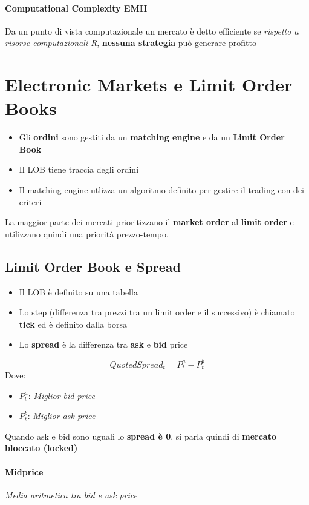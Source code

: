 \documentclass[12pt]{article}
\begin{document}
\paragraph{Computational Complexity EMH}
Da un punto di vista computazionale un mercato è detto efficiente se \textit{rispetto a risorse computazionali R}, \textbf{nessuna strategia} può generare profitto
\newpage
\section{Electronic Markets e Limit Order Books}
\begin{itemize}
    \item Gli \textbf{ordini} sono gestiti da un \textbf{matching engine} e da un \textbf{Limit Order Book}
    \item Il LOB tiene traccia degli ordini
    \item Il matching engine utlizza un algoritmo definito per gestire il trading con dei criteri
\end{itemize}
La maggior parte dei mercati prioritizzano il \textbf{market order} al \textbf{limit order} e utilizzano quindi una priorità prezzo-tempo.
\subsection{Limit Order Book e Spread}
\begin{itemize}
    \item Il LOB è definito su una tabella
    \item Lo step (differenza tra prezzi tra un limit order e il successivo) è chiamato \textbf{tick} ed è definito dalla borsa
    \item Lo \textbf{spread} è la differenza tra \textbf{ask} e \textbf{bid} price
\end{itemize}
$$QuotedSpread_t = P_t^a-P_t^b$$
Dove:
\begin{itemize}[label=]
    \item $P_t^a$: \textit{Miglior bid price}
    \item $P_t^b$: \textit{Miglior ask price}
\end{itemize}
Quando ask e bid sono uguali lo \textbf{spread è 0}, si parla quindi di \textbf{mercato bloccato (locked)}
\paragraph{Midprice} \textit{Media aritmetica tra bid e ask price}
\end{document}
